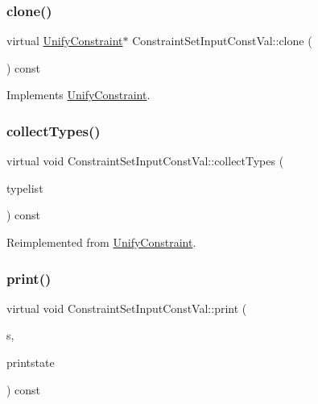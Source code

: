 \subsubsection{\texorpdfstring{clone()}{clone()}}
{\footnotesize\ttfamily virtual \mbox{\hyperlink{class_unify_constraint}{Unify\+Constraint}}$\ast$ Constraint\+Set\+Input\+Const\+Val\+::clone (\begin{DoxyParamCaption}\item[{void}]{ }\end{DoxyParamCaption}) const\hspace{0.3cm}{\ttfamily [virtual]}}



Implements \mbox{\hyperlink{class_unify_constraint_a4f068343932637d355644bb21559aa12}{Unify\+Constraint}}.

\mbox{\label{class_constraint_set_input_const_val_a0d99b21ceee2023bb4f3f12ed745b218}} 
\subsubsection{\texorpdfstring{collectTypes()}{collectTypes()}}
{\footnotesize\ttfamily virtual void Constraint\+Set\+Input\+Const\+Val\+::collect\+Types (\begin{DoxyParamCaption}\item[{vector$<$ \mbox{\hyperlink{class_unify_datatype}{Unify\+Datatype}} $>$ \&}]{typelist }\end{DoxyParamCaption}) const\hspace{0.3cm}{\ttfamily [virtual]}}



Reimplemented from \mbox{\hyperlink{class_unify_constraint_acb83b6bea3b21e13054e72ac9cfaba0f}{Unify\+Constraint}}.

\mbox{\label{class_constraint_set_input_const_val_a0c6e05609e3f895938f504216d585c37}} 
\subsubsection{\texorpdfstring{print()}{print()}}
{\footnotesize\ttfamily virtual void Constraint\+Set\+Input\+Const\+Val\+::print (\begin{DoxyParamCaption}\item[{ostream \&}]{s,  }\item[{\mbox{\hyperlink{class_unify_c_printer}{Unify\+C\+Printer}} \&}]{printstate }\end{DoxyParamCaption}) const\hspace{0.3cm}{\ttfamily [virtual]}}



